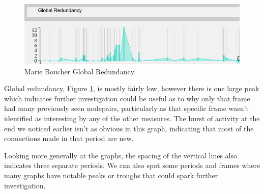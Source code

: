 \begin{figure}[h!]
  \begin{center}
  \includegraphics[trim={0 0 0 0}, width=140mm]{./Figures/marieBoucherGlobalRedundancy.png}
  \caption{Marie Boucher Global Redundancy}
  \label{fig:marieBoucherGlobalRedundancy}
  \end{center}
\end{figure}
Global redundancy, Figure \ref{fig:marieBoucherGlobalRedundancy}, is mostly fairly low, however there is one large peak which indicates further investigation could be useful as to why only that frame had many previously seen nodepairs, particularly as that specific frame wasn't identified as interesting by any of the other measures. The burst of activity at the end we noticed earlier isn't as obvious in this graph, indicating that most of the connections made in that period are new.
    
Looking more generally at the graphs, the spacing of the vertical lines also indicates three separate periods. We can also spot some periods and frames where many graphs have notable peaks or troughs that could spark further investigation.
    
